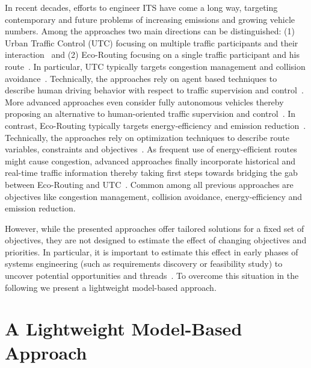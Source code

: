 \documentclass[conference]{../cls/IEEEtran}
\begin{document}
In recent decades, efforts to engineer ITS have come a long way, targeting contemporary and future problems of increasing emissions and growing vehicle numbers. Among the approaches two main directions can be distinguished: (1) Urban Traffic Control (UTC) focusing on multiple traffic participants and their interaction~\cite{Chen2010,Dresner2008} and (2) Eco-Routing focusing on a single traffic participant and his route~\cite{Ericsson2006, Barth2007,Boriboonsomsin2012}. In particular, UTC typically targets congestion management and collision avoidance~\cite{Chen2010}. Technically, the approaches rely on agent based techniques to describe human driving behavior with respect to traffic supervision and control~\cite{Chen2010}. More advanced approaches even consider fully autonomous vehicles thereby proposing an alternative to human-oriented traffic supervision and control~\cite{Dresner2008}. In contrast, Eco-Routing typically targets energy-efficiency and emission reduction~\cite{Ericsson2006,Barth2007}. Technically, the approaches rely on optimization techniques to describe route variables, constraints and objectives~\cite{Ericsson2006,Barth2007}. As frequent use of energy-efficient routes might cause congestion, advanced approaches finally incorporate historical and real-time traffic information thereby taking first steps towards bridging the gab between Eco-Routing and UTC~\cite{Boriboonsomsin2012}. Common among all previous approaches are objectives like congestion management, collision avoidance, energy-efficiency and emission reduction.

However, while the presented approaches offer tailored solutions for a fixed set of objectives, they are not designed to estimate the effect of changing objectives and priorities. In particular, it is important to estimate this effect in early phases of systems engineering (such as requirements discovery or feasibility study) to uncover potential opportunities and threads~\cite{Whitten2005}. To overcome this situation in the following we present a lightweight model-based approach.

\section{A Lightweight Model-Based Approach}
\end{document}
